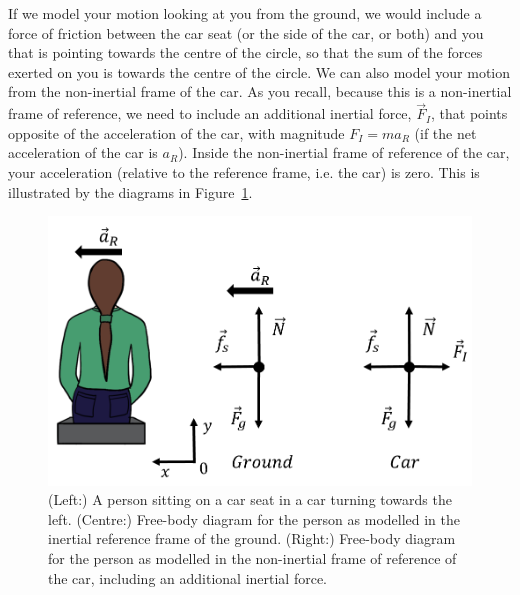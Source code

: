 If we model your motion looking at you from the ground, we would include a force of friction between the car seat (or the side of the car, or both) and you that is pointing towards the centre of the circle, so that the sum of the forces exerted on you is towards the centre of the circle. We can also model your motion from the non-inertial frame of the car. As you recall, because this is a non-inertial frame of reference, we need to include an additional inertial force, $\vec F_I$, that points opposite of the acceleration of the car, with magnitude $F_I=ma_R$ (if the net acceleration of the car is $a_R$). Inside the non-inertial frame of reference of the car, your acceleration (relative to the reference frame, i.e. the car) is zero. This is illustrated by the diagrams in Figure~\ref{fig:applyingnewtonslaws:carinertial}.

\begin{figure}[!htbp]
\centering
\includegraphics[width=0.6\linewidth]{files/carinertial-f8a601732d9a4618a143e7df196a197c.png}
\caption[]{(Left:) A person sitting on a car seat in a car turning towards the left. (Centre:) Free-body diagram for the person as modelled in the inertial reference frame of the ground. (Right:) Free-body diagram for the person as modelled in the non-inertial frame of reference of the car, including an additional inertial force.}
\label{fig:applyingnewtonslaws:carinertial}
\end{figure}

